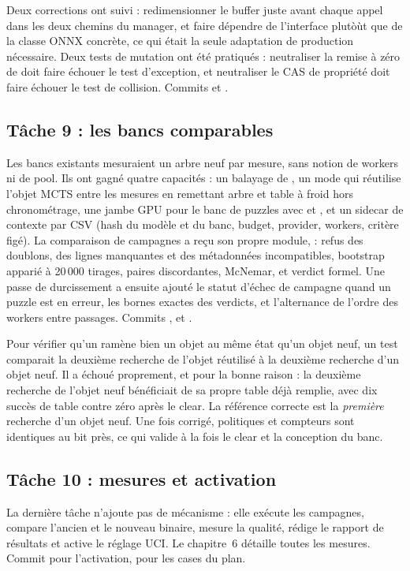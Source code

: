 Deux corrections ont suivi : redimensionner le buffer juste avant chaque
appel dans les deux chemins du manager, et faire d\'ependre
 de l'interface  plut\`o\`ut que de la
classe ONNX concr\`ete, ce qui \'etait la seule adaptation de production
n\'ecessaire. Deux tests de mutation ont \'et\'e pratiqu\'es : neutraliser la
remise \`a z\'ero de  doit faire \'echouer le test d'exception,
et neutraliser le CAS de propri\'et\'e doit faire \'echouer le test de
collision. Commits  et .

\subsection{T\^ache 9 : les bancs comparables}
\label{sec:t9}

Les bancs existants mesuraient un arbre neuf par mesure, sans notion de
workers ni de pool. Ils ont gagn\'e quatre capacit\'es : un balayage de
, un mode  qui r\'eutilise l'objet
MCTS entre les mesures en remettant arbre et table \`a froid hors
chronom\'etrage, une jambe GPU pour le banc de puzzles avec
 et , et un sidecar de
contexte par CSV (hash du mod\`ele et du banc, budget, provider, workers,
crit\`ere fig\'e). La comparaison de campagnes a re\c{c}u son propre module,
 : refus des doublons, des lignes manquantes et
des m\'etadonn\'ees incompatibles, bootstrap appari\'e \`a 20\,000 tirages,
paires discordantes, McNemar, et verdict formel. Une passe de durcissement a
ensuite ajout\'e le statut d'\'echec de campagne quand un puzzle est en
erreur, les bornes exactes des verdicts, et l'alternance de l'ordre des
workers entre passages. Commits ,  et
.

\begin{piege}
Pour v\'erifier qu'un  ram\`ene bien un
objet au m\^eme \'etat qu'un objet neuf, un test comparait la deuxi\`eme
recherche de l'objet r\'eutilis\'e \`a la deuxi\`eme recherche d'un objet
neuf. Il a \'echou\'e proprement, et pour la bonne raison : la deuxi\`eme
recherche de l'objet neuf b\'en\'eficiait de sa propre table d\'ej\`a
remplie, avec dix succ\`es de table contre z\'ero apr\`es le clear. La
r\'ef\'erence correcte est la \emph{premi\`ere} recherche d'un objet neuf.
Une fois corrig\'e, politiques et compteurs sont identiques au bit pr\`es,
ce qui valide \`a la fois le clear et la conception du banc.
\end{piege}

\subsection{T\^ache 10 : mesures et activation}
\label{sec:t10}

La derni\`ere t\^ache n'ajoute pas de m\'ecanisme : elle ex\'ecute les
campagnes, compare l'ancien et le nouveau binaire, mesure la qualit\'e,
r\'edige le rapport de r\'esultats et active le r\'eglage UCI. Le
chapitre~6 d\'etaille toutes les mesures. Commit  pour
l'activation,  pour les cases du plan.
